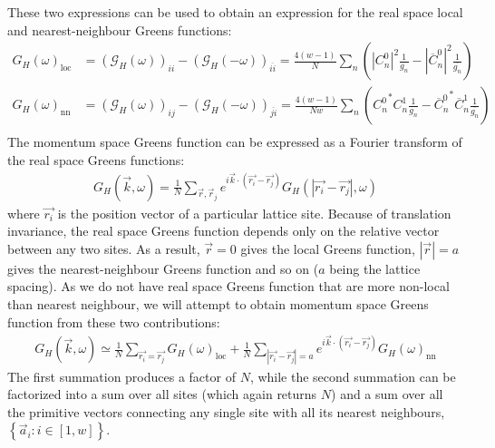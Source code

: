\documentclass{report}
\numberwithin{equation}{section}
\begin{document}
These two expressions can be used to obtain an expression for the real space local and nearest-neighbour Greens functions:
\begin{equation}\begin{aligned}
	G_H(\omega)_\text{loc} &= \left(\mathcal{G}_H(\omega)\right)_{ii} - \left(\mathcal{G}_H(-\omega)\right)_{\overline{ii}} = \frac{4(w-1)}{N}\sum_n\left(|C^0_{n}|^2 \frac{1}{g_n} - |\overline C^0_{n}|^2 \frac{1}{\overline{g_n}}\right)\\
	G_H(\omega)_\text{nn} &= \left(\mathcal{G}_H(\omega)\right)_{ij} - \left(\mathcal{G}_H(-\omega)\right)_{\overline{ji}} = \frac{4(w-1)}{Nw}\sum_n\left({C^0_{n}}^* C^1_{n} \frac{1}{g_n} - {\overline C^0_{n}}^* \overline C^1_{n} \frac{1}{\overline{g_n}}\right)\\
\end{aligned}\end{equation}
The momentum space Greens function can be expressed as a Fourier transform of the real space Greens functions:
\begin{equation}\begin{aligned}
	G_H (\vec k, \omega) = \frac{1}{N}\sum_{\vec r, \vec r_j}e^{i \vec{k}\cdot\left(\vec{r_i} - \vec {r_j}\right)}G_H (|\vec{r_i} - \vec {r_j}|, \omega)
\end{aligned}\end{equation}
where $\vec{r_i}$ is the position vector of a particular lattice site. Because of translation invariance, the real space Greens function depends only on the relative vector between any two sites. As a result, $\vec r=0$ gives the local Greens function, $|\vec r|=a$ gives the nearest-neighbour Greens function and so on ($a$ being the lattice spacing). As we do not have real space Greens function that are more non-local than nearest neighbour, we will attempt to obtain momentum space Greens function from these two contributions:
\begin{equation}\begin{aligned}
	G_H (\vec k, \omega) \simeq \frac{1}{N}\sum_{\vec{r_i} = \vec {r_j}}G_H (\omega)_\text{loc} + \frac{1}{N}\sum_{|\vec{r_i} - \vec {r_j}|=a} e^{i \vec{k}\cdot\left(\vec{r_i} - \vec {r_j}\right)}G_H (\omega)_\text{nn}
\end{aligned}\end{equation}
The first summation produces a factor of $N$, while the second summation can be factorized into a sum over all sites (which again returns $N$) and a sum over all the primitive vectors connecting any single site with all its nearest neighbours, $\left\{ \vec a_i: i \in \left[1, w\right]\right\}$.
\end{document}
